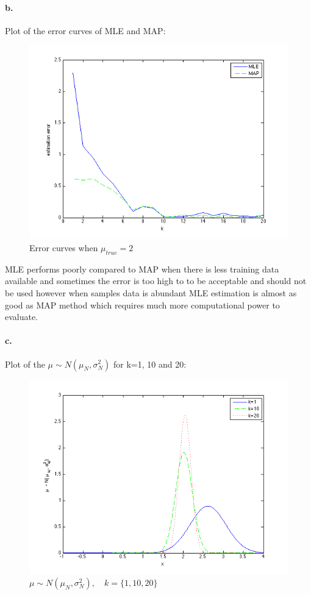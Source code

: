 \documentclass[a4paper]{article}
\begin{document}
\paragraph{b.} Plot of the error curves of MLE and MAP:\\
\begin{figure}[H]
  \centering
    \includegraphics[scale=.47]{images/4_esti_error.png}
  \caption{Error curves when $\mu_{true} = 2$}
\end{figure}

MLE performs poorly compared to MAP when there is less training data available and sometimes the error is too high to to be acceptable and should not be used however when samples data is abundant MLE estimation is almost as good as MAP method which requires much more computational power to evaluate.

\paragraph{c.} Plot of the $\mu \sim N(\mu_{N}, \sigma^{2}_{N})$ for k=1, 10 and 20:\\
\begin{figure}[H]
  \centering
    \includegraphics[scale=.47]{images/4_posterior_pdf.png}
  \caption{$\mu \sim N(\mu_{N}, \sigma^{2}_{N}), \quad k=\{1, 10, 20\}$}
\end{figure}
\end{document}
